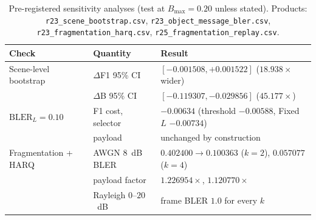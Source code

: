 \documentclass[journal]{IEEEtran}
\begin{document}
\begin{table}[t]
\centering
\footnotesize
\setlength{\tabcolsep}{3pt}
\caption{Pre-registered sensitivity analyses (test at $B_{\max}=0.20$ unless stated). Products:
\texttt{r23\_scene\_bootstrap.csv}, \texttt{r23\_object\_message\_bler.csv},
\texttt{r23\_fragmentation\_harq.csv}, \texttt{r25\_fragmentation\_replay.csv}.}
\label{tab:sensitivity}
\begin{tabular}{@{}lll@{}}
\toprule
Check & Quantity & Result \\
\midrule
Scene-level bootstrap & $\Delta$F1 95\% CI & $[-0.001508,+0.001522]$ ($18.938\times$ wider) \\
                      & $\Delta$B 95\% CI  & $[-0.119307,-0.029856]$ ($45.177\times$) \\
$\mathrm{BLER}_L=0.10$ & F1 cost, selector  & $-0.00634$ (threshold $-0.00588$, Fixed $L$ $-0.00734$) \\
                       & payload            & unchanged by construction \\
Fragmentation + HARQ & AWGN $8$~dB BLER     & $0.402400 \to 0.100363$ ($k{=}2$), $0.057077$ ($k{=}4$) \\
                     & payload factor       & $1.226954\times$, $1.120770\times$ \\
                     & Rayleigh $0$--$20$~dB & frame BLER $1.0$ for every $k$ \\
\bottomrule
\end{tabular}
\end{table}
\end{document}
